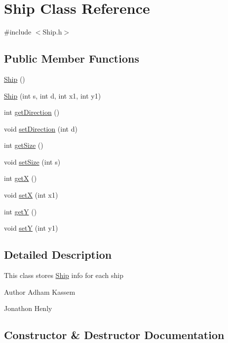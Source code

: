 \hypertarget{classShip}{}\section{Ship Class Reference}
\label{classShip}


{\ttfamily \#include $<$Ship.\+h$>$}

\subsection*{Public Member Functions}
\begin{DoxyCompactItemize}
\item 
\hyperlink{classShip_ab7608fcfc4d27c678aacaf9bfd68a462}{Ship} ()
\item 
\hyperlink{classShip_a4d3829d2e927758bdb8ed7880e9403b4}{Ship} (int s, int d, int x1, int y1)
\item 
int \hyperlink{classShip_aafc09bad24dab9a7cb29e5c8f2b10226}{get\+Direction} ()
\item 
void \hyperlink{classShip_aa37f8f11f87ee3e17285816c5c6dc6f8}{set\+Direction} (int d)
\item 
int \hyperlink{classShip_aa741cc8f584a3fef5450d22cbde8a5f4}{get\+Size} ()
\item 
void \hyperlink{classShip_a764524af38d064e299e0ba90ae5f0a32}{set\+Size} (int s)
\item 
int \hyperlink{classShip_a846040dad9c03dec8d6bdfc24753f05b}{getX} ()
\item 
void \hyperlink{classShip_a060abd2e81215121f18112b88971161e}{setX} (int x1)
\item 
int \hyperlink{classShip_a0cde4e9b74fb71cbf61f79e0a1b74059}{getY} ()
\item 
void \hyperlink{classShip_a6637c65a27a5d08b151e1763ec67c4e6}{setY} (int y1)
\end{DoxyCompactItemize}


\subsection{Detailed Description}
This class stores \hyperlink{classShip}{Ship} info for each ship \begin{DoxyAuthor}{Author}
Adham Kassem 

Jonathon Henly 
\end{DoxyAuthor}


\subsection{Constructor \& Destructor Documentation}
\mbox{\label{classShip_ab7608fcfc4d27c678aacaf9bfd68a462}} 
